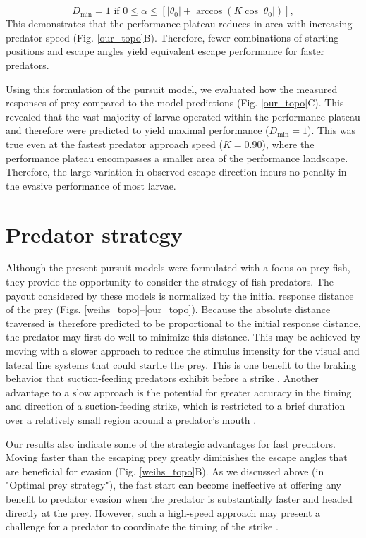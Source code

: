 \documentclass[12pt]{article}
\newcommand{\ol}{\overline}
\begin{document}
%
\begin{equation}
\ol D_{\text{min}}=1 \text{ if }  0 \leq \alpha  \leq  [|\theta_0 |  + \arccos(K \cos | \theta_0 |)],
 \end{equation}
%
This demonstrates that the performance plateau reduces in area with increasing predator speed (Fig. \ref{our_topo}B). Therefore, fewer combinations of starting positions and escape angles yield equivalent escape performance for faster predators.

Using this formulation of the pursuit model, we evaluated how the measured responses of prey compared to the model predictions (Fig. \ref{our_topo}C). This revealed that the vast majority of larvae operated within the performance plateau and therefore were predicted to yield maximal performance ($\ol D_{\text{min}}=1$). This was true even at the fastest predator approach speed ($K=0.90$), where the performance plateau encompasses a smaller area of the performance landscape. Therefore, the large variation in observed escape direction incurs no penalty in the evasive performance of most larvae. 


\section{Predator strategy}

Although the present pursuit models were formulated with a focus on prey fish, they provide the opportunity to consider the strategy of fish predators. The payout considered by these models is normalized by the initial response distance of the prey (Figs. \ref{weihs_topo}--\ref{our_topo}). Because the absolute distance traversed is therefore predicted to be proportional to the initial response distance, the predator may first do well to minimize this distance. This may be achieved by moving with a slower approach to reduce the stimulus intensity for the visual \citep{Dill:1974ws} and lateral line \citep{Stewart:2014cm} systems that could startle the prey. This is one benefit to the braking behavior that suction-feeding predators exhibit before a strike \citep{Higham:2007go, Higham:2005iu}. Another advantage to a slow approach is the potential for greater accuracy in the timing and direction of a suction-feeding strike, which is restricted to a brief duration over a relatively small region around a predator's mouth \citep{Wainwright:2001ufa}. 

Our results also indicate some of the strategic advantages for fast predators. Moving faster than the escaping prey greatly diminishes the escape angles that are beneficial for evasion (Fig. \ref{weihs_topo}B). As we discussed above (in "Optimal prey strategy"), the fast start can become ineffective at offering any benefit to predator evasion when the predator is substantially faster and headed directly at the prey. However, such a high-speed approach may present a challenge for a predator to coordinate the timing of the strike \citep{Higham:2007go, Higham:2005iu}. 
\end{document}
